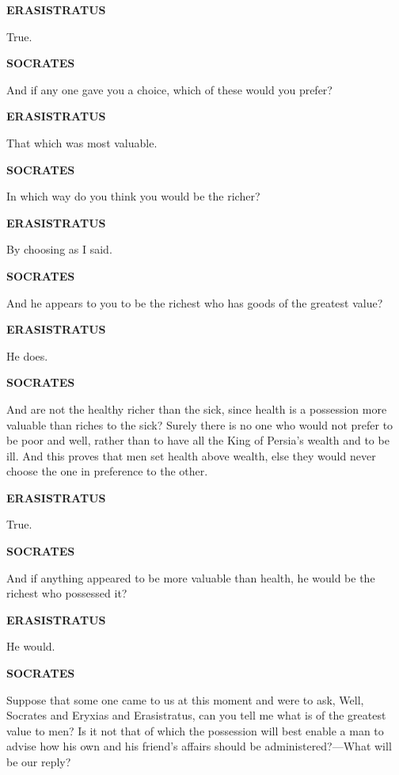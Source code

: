 \documentclass[11pt,letter]{article}
\begin{document}
\par \textbf{ERASISTRATUS}
\par   True.

\par \textbf{SOCRATES}
\par   And if any one gave you a choice, which of these would you prefer?

\par \textbf{ERASISTRATUS}
\par   That which was most valuable.

\par \textbf{SOCRATES}
\par   In which way do you think you would be the richer?

\par \textbf{ERASISTRATUS}
\par   By choosing as I said.

\par \textbf{SOCRATES}
\par   And he appears to you to be the richest who has goods of the greatest value?

\par \textbf{ERASISTRATUS}
\par   He does.

\par \textbf{SOCRATES}
\par   And are not the healthy richer than the sick, since health is a possession more valuable than riches to the sick? Surely there is no one who would not prefer to be poor and well, rather than to have all the King of Persia's wealth and to be ill. And this proves that men set health above wealth, else they would never choose the one in preference to the other.

\par \textbf{ERASISTRATUS}
\par   True.

\par \textbf{SOCRATES}
\par   And if anything appeared to be more valuable than health, he would be the richest who possessed it?

\par \textbf{ERASISTRATUS}
\par   He would.

\par \textbf{SOCRATES}
\par   Suppose that some one came to us at this moment and were to ask, Well, Socrates and Eryxias and Erasistratus, can you tell me what is of the greatest value to men? Is it not that of which the possession will best enable a man to advise how his own and his friend's affairs should be administered?—What will be our reply?
\end{document}

